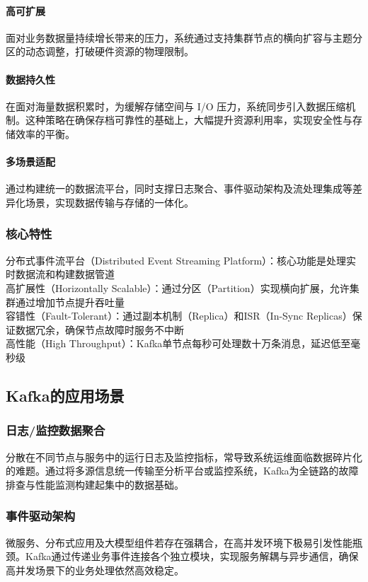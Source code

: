 			\paragraph{高可扩展}
			面对业务数据量持续增长带来的压力，系统通过支持集群节点的横向扩容与主题分区的动态调整，打破硬件资源的物理限制。
			\paragraph{数据持久性}
			在面对海量数据积累时，为缓解存储空间与 I/O 压力，系统同步引入数据压缩机制。这种策略在确保存档可靠性的基础上，大幅提升资源利用率，实现安全性与存储效率的平衡。
			\paragraph{多场景适配}
			通过构建统一的数据流平台，同时支撑日志聚合、事件驱动架构及流处理集成等差异化场景，实现数据传输与存储的一体化。
		
		\subsubsection{核心特性}
		分布式事件流平台（Distributed Event Streaming Platform）：核心功能是处理实时数据流和构建数据管道\\
		高扩展性（Horizontally Scalable）：通过分区（Partition）实现横向扩展，允许集群通过增加节点提升吞吐量\\
		容错性（Fault-Tolerant）：通过副本机制（Replica）和ISR（In-Sync Replicas）保证数据冗余，确保节点故障时服务不中断\\
		高性能（High Throughput）：Kafka单节点每秒可处理数十万条消息，延迟低至毫秒级
		
	\subsection{Kafka的应用场景}
		\subsubsection{日志/监控数据聚合}
		分散在不同节点与服务中的运行日志及监控指标，常导致系统运维面临数据碎片化的难题。通过将多源信息统一传输至分析平台或监控系统，Kafka为全链路的故障排查与性能监测构建起集中的数据基础。
		\subsubsection{事件驱动架构}
		微服务、分布式应用及大模型组件若存在强耦合，在高并发环境下极易引发性能瓶颈。Kafka通过传递业务事件连接各个独立模块，实现服务解耦与异步通信，确保高并发场景下的业务处理依然高效稳定。
